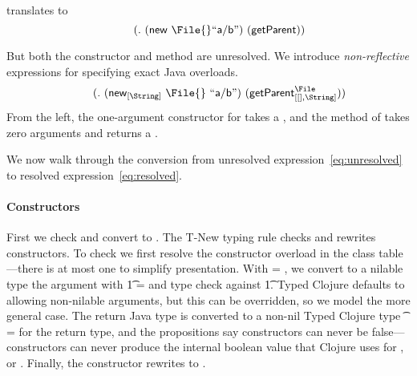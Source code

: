  
translates to
\begin{equation}  \label{eq:unresolved}
  \qquad {\methodexp {\getparent{}} {\newexp {\File{}} {\makestr{a/b}}} {}}
\end{equation}

But both the constructor and method are unresolved.
We introduce \emph{non-reflective} expressions for specifying exact Java overloads.
\begin{equation} \label{eq:resolved}
\qquad {\methodstaticexp {\File} {} {\String} {\getparent{}} {\newstaticexp {\String} {\File{}} {\File{}} {\makestr{a/b}}} {}}
\end{equation}
From the left, the one-argument constructor for \File takes a \String, and the 
\getparent{} method of
\File{} takes zero arguments
and
returns a \String.

We now walk through the conversion from unresolved expression~\ref{eq:unresolved} to 
resolved expression~\ref{eq:resolved}.

\paragraph{Constructors} First we check and convert {\newexp {\File{}} {}} to {\newstaticexp {\String} {\File{}} {\File{}} {}}.
The T-New typing rule checks and rewrites constructors.
To check
{\newexp {\File{}} {}}
we first resolve the constructor overload in the class table---there is at most one
to simplify presentation.
With  = \String,
we convert to a nilable type the argument with \t{1} = \Union{\Nil}{\String}
and type check {} against \t{1}.
Typed Clojure defaults to allowing non-nilable arguments, but this
can be overridden, so we model the more general case.
The return Java type \File is converted to a non-nil
Typed Clojure type \t{} = \File for the return type,
and the propositions say constructors can never be false---constructors
can never produce the internal boolean value that Clojure uses for \false{}, or \nil{}.
Finally, the constructor rewrites to {\newstaticexp {\String} {\File{}} {\File{}} {}}.

